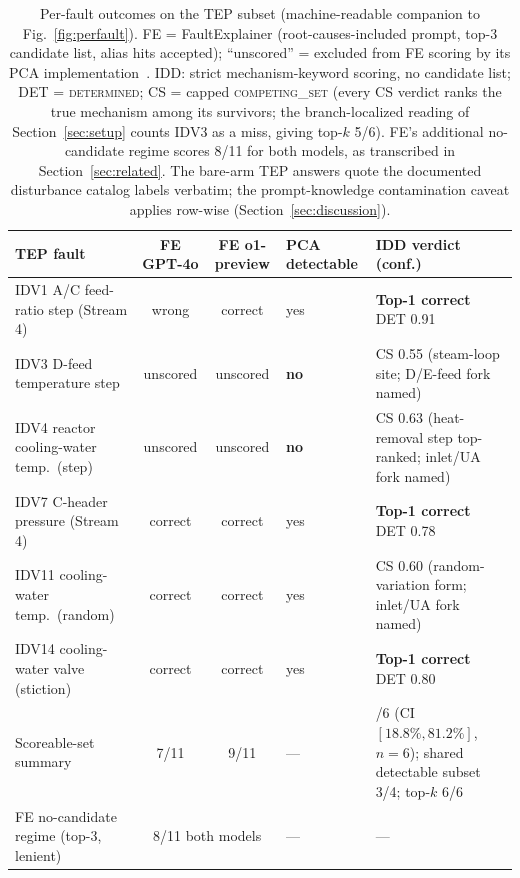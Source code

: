 \documentclass[preprint,10pt]{elsarticle}
\begin{document}
\begin{table}[!t]
\caption{Per-fault outcomes on the TEP subset (machine-readable companion to Fig.~\ref{fig:perfault}). FE = FaultExplainer (root-causes-included prompt, top-3 candidate list, alias hits accepted); ``unscored'' = excluded from FE scoring by its PCA implementation~\cite{chiang2001fault}. IDD: strict mechanism-keyword scoring, no candidate list; DET = \mbox{\textsc{determined}}; CS = capped \mbox{\textsc{competing\_set}} (every CS verdict ranks the true mechanism among its survivors; the branch-localized reading of Section~\ref{sec:setup} counts IDV3 as a miss, giving top-$k$ 5/6). FE's additional no-candidate regime scores 8/11 for both models, as transcribed in Section~\ref{sec:related}. The bare-arm TEP answers quote the documented disturbance catalog labels verbatim; the prompt-knowledge contamination caveat applies row-wise (Section~\ref{sec:discussion}).}
\label{tab:perfault}
\centering
\footnotesize\setlength{\tabcolsep}{2.5pt}\renewcommand{\arraystretch}{1.06}
\begin{tabular}{@{}>{\raggedright\arraybackslash}p{2.9cm}cc>{\raggedright\arraybackslash}p{1.5cm}>{\raggedright\arraybackslash}p{3.5cm}@{}}
\toprule
TEP fault & FE GPT-4o & FE o1-preview & PCA detectable & IDD verdict (conf.) \\
\midrule
IDV1 A/C feed-ratio step (Stream 4) & wrong & correct & yes & \textbf{Top-1 correct} DET 0.91 \\
IDV3 D-feed temperature step & unscored & unscored & \textbf{no} & CS 0.55 (steam-loop site; D/E-feed fork named) \\
IDV4 reactor cooling-water temp.\ (step) & unscored & unscored & \textbf{no} & CS 0.63 (heat-removal step top-ranked; inlet/UA fork named) \\
IDV7 C-header pressure (Stream 4) & correct & correct & yes & \textbf{Top-1 correct} DET 0.78 \\
IDV11 cooling-water temp.\ (random) & correct & correct & yes & CS 0.60 (random-variation form; inlet/UA fork named) \\
IDV14 cooling-water valve (stiction) & correct & correct & yes & \textbf{Top-1 correct} DET 0.80 \\
\midrule
Scoreable-set summary & 7/11 & 9/11 &---& 3/6 (CI $[18.8\%,81.2\%]$, $n{=}6$); shared detectable subset 3/4; top-$k$ 6/6 \\
\midrule
FE no-candidate regime (top-3, lenient) & \multicolumn{2}{c}{8/11 both models} &---&---\\
\bottomrule
\end{tabular}
\end{table}
\end{document}
